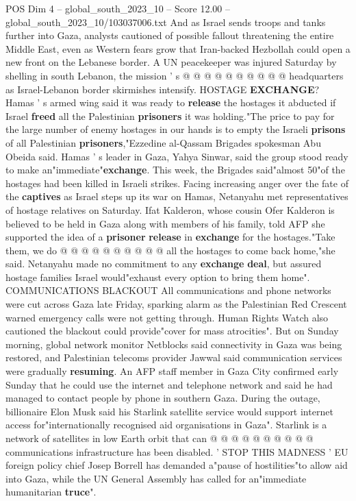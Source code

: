 \begin{textsample}{POS Dim 4 – global\_south\_2023\_10 – Score 12.00 – global\_south\_2023\_10/103037006.txt}
And as Israel sends troops and tanks further into Gaza, analysts cautioned of possible fallout threatening the entire Middle East, even as Western fears grow that Iran-backed Hezbollah could open a new front on the Lebanese border.
A UN peacekeeper was injured Saturday by shelling in south Lebanon, the mission ' s @ @ @ @ @ @ @ @ @ @ headquarters as Israel-Lebanon border skirmishes intensify.
HOSTAGE \textbf{EXCHANGE}?
Hamas ' s armed wing said it was ready to \textbf{release} the hostages it abducted if Israel \textbf{freed} all the Palestinian \textbf{prisoners} it was holding."The price to pay for the large number of enemy hostages in our hands is to empty the Israeli \textbf{prisons} of all Palestinian \textbf{prisoners},"Ezzedine al-Qassam Brigades spokesman Abu Obeida said.
Hamas ' s leader in Gaza, Yahya Sinwar, said the group stood ready to make an"immediate"\textbf{exchange}.
This week, the Brigades said"almost 50"of the hostages had been killed in Israeli strikes.
Facing increasing anger over the fate of the \textbf{captives} as Israel steps up its war on Hamas, Netanyahu met representatives of hostage relatives on Saturday.
Ifat Kalderon, whose cousin Ofer Kalderon is believed to be held in Gaza along with members of his family, told AFP she supported the idea of a \textbf{prisoner} \textbf{release} in \textbf{exchange} for the hostages."Take them, we do @ @ @ @ @ @ @ @ @ @ all the hostages to come back home,"she said.
Netanyahu made no commitment to any \textbf{exchange} \textbf{deal}, but assured hostage families Israel would"exhaust every option to bring them home".
COMMUNICATIONS BLACKOUT All communications and phone networks were cut across Gaza late Friday, sparking alarm as the Palestinian Red Crescent warned emergency calls were not getting through.
Human Rights Watch also cautioned the blackout could provide"cover for mass atrocities".
But on Sunday morning, global network monitor Netblocks said connectivity in Gaza was being restored, and Palestinian telecoms provider Jawwal said communication services were gradually \textbf{resuming}.
An AFP staff member in Gaza City confirmed early Sunday that he could use the internet and telephone network and said he had managed to contact people by phone in southern Gaza.
During the outage, billionaire Elon Musk said his Starlink satellite service would support internet access for"internationally recognised aid organisations in Gaza".
Starlink is a network of satellites in low Earth orbit that can @ @ @ @ @ @ @ @ @ @ communications infrastructure has been disabled. ' STOP THIS MADNESS ' EU foreign policy chief Josep Borrell has demanded a"pause of hostilities"to allow aid into Gaza, while the UN General Assembly has called for an"immediate humanitarian \textbf{truce}".

\end{textsample}

